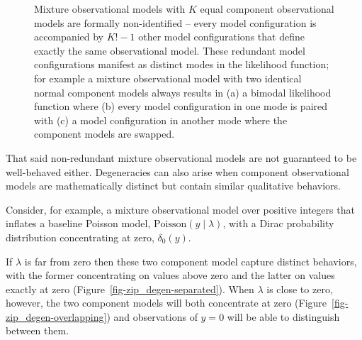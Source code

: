 \documentclass[
  letterpaper,
  DIV=11,
  numbers=noendperiod]{scrartcl}
\begin{document}
\begin{figure}
\caption{\label{fig-label-switching}Mixture observational models with
\(K\) equal component observational models are formally non-identified
-- every model configuration is accompanied by \(K! - 1\) other model
configurations that define exactly the same observational model. These
redundant model configurations manifest as distinct modes in the
likelihood function; for example a mixture observational model with two
identical normal component models always results in (a) a bimodal
likelihood function where (b) every model configuration in one mode is
paired with (c) a model configuration in another mode where the
component models are swapped.}

\end{figure}%

That said non-redundant mixture observational models are not guaranteed
to be well-behaved either. Degeneracies can also arise when component
observational models are mathematically distinct but contain similar
qualitative behaviors.

Consider, for example, a mixture observational model over positive
integers that inflates a baseline Poisson model,
\(\mathrm{Poisson}(y \mid \lambda)\), with a Dirac probability
distribution concentrating at zero, \(\delta_{0}(y)\).

If \(\lambda\) is far from zero then these two component model capture
distinct behaviors, with the former concentrating on values above zero
and the latter on values exactly at zero
(Figure~\ref{fig-zip_degen-separated}). When \(\lambda\) is close to
zero, however, the two component models will both concentrate at zero
(Figure~\ref{fig-zip_degen-overlapping}) and observations of \(y = 0\)
will be able to distinguish between them.
\end{document}
